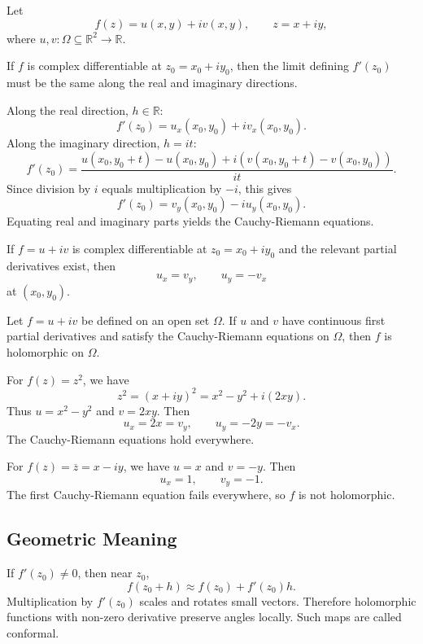 Let
\[
    f(z)=u(x,y)+iv(x,y),
    \qquad z=x+iy,
\]
where $u,v:\Omega\subseteq\mathbb{R}^2\to\mathbb{R}$.

If $f$ is complex differentiable at $z_0=x_0+iy_0$, then the limit defining $f'(z_0)$ must be the same along the real and imaginary directions.

Along the real direction, $h\in\mathbb{R}$:
\[
    f'(z_0)=u_x(x_0,y_0)+iv_x(x_0,y_0).
\]
Along the imaginary direction, $h=it$:
\[
    f'(z_0)=\frac{u(x_0,y_0+t)-u(x_0,y_0)+i(v(x_0,y_0+t)-v(x_0,y_0))}{it}.
\]
Since division by $i$ equals multiplication by $-i$, this gives
\[
    f'(z_0)=v_y(x_0,y_0)-iu_y(x_0,y_0).
\]
Equating real and imaginary parts yields the Cauchy-Riemann equations.

\begin{theorem}
If $f=u+iv$ is complex differentiable at $z_0=x_0+iy_0$ and the relevant partial derivatives exist, then
\[
    u_x=v_y,
    \qquad
    u_y=-v_x
\]
at $(x_0,y_0)$.
\end{theorem}

\begin{theorem}
Let $f=u+iv$ be defined on an open set $\Omega$. If $u$ and $v$ have continuous first partial derivatives and satisfy the Cauchy-Riemann equations on $\Omega$, then $f$ is holomorphic on $\Omega$.
\end{theorem}

\begin{example}
For $f(z)=z^2$, we have
\[
    z^2=(x+iy)^2=x^2-y^2+i(2xy).
\]
Thus $u=x^2-y^2$ and $v=2xy$. Then
\[
    u_x=2x=v_y,
    \qquad
    u_y=-2y=-v_x.
\]
The Cauchy-Riemann equations hold everywhere.
\end{example}

\begin{example}
For $f(z)=\overline{z}=x-iy$, we have $u=x$ and $v=-y$. Then
\[
    u_x=1,
    \qquad
    v_y=-1.
\]
The first Cauchy-Riemann equation fails everywhere, so $f$ is not holomorphic.
\end{example}

\subsection{Geometric Meaning}

If $f'(z_0)\neq 0$, then near $z_0$,
\[
    f(z_0+h)\approx f(z_0)+f'(z_0)h.
\]
Multiplication by $f'(z_0)$ scales and rotates small vectors. Therefore holomorphic functions with non-zero derivative preserve angles locally. Such maps are called conformal.

